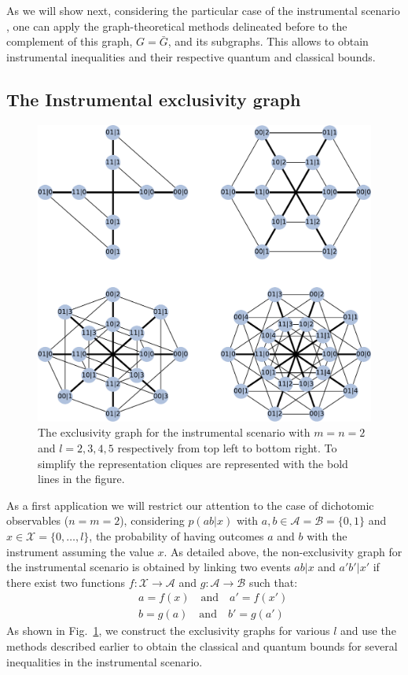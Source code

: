\documentclass[letterpaper]{article}
\begin{document}
As we will show next, considering the particular case of the instrumental
scenario \cite{pearl1995, bonet2001}, one can apply the graph-theoretical methods delineated before
to the complement of this graph, $G=\bar{G}$, and its subgraphs. This allows to
obtain instrumental inequalities and their respective quantum and
classical bounds.

\subsection{The Instrumental exclusivity graph}
\begin{figure}[t]
    \centering
    \includegraphics[width=\columnwidth]{images/instrumental_exgraph.pdf}
    \caption{
    The exclusivity graph for the instrumental scenario with $m = n =2$ and $l=2,3,4,5$
    respectively from top left to bottom right. 
    To simplify the representation cliques are represented with the bold lines
    in the figure.}
    \label{fig:instrumental_exgraphs}
\end{figure}

As a first application we will restrict our attention to the case of
dichotomic observables ($n = m = 2$), considering $p(ab|x)$ with $a, b \in
\mathcal{A} = \mathcal{B} = \{0,1\}$ and $x \in
\mathcal{X} = \{0,\ldots,l\}$, the probability of having outcomes $a$ and $b$
with the instrument assuming the value $x$. As detailed above, the
non-exclusivity graph for the instrumental scenario is obtained by linking two
events $ab|x$ and $a'b'|x'$ if there exist two functions $f:\mathcal{X}
\rightarrow \mathcal{A}$ and $g:\mathcal{A} \rightarrow
\mathcal{B}$ such that:
\begin{eqnarray}
   & &  a = f(x) \quad\text{and}\quad a'=f(x')\\ \nonumber
   & & b = g(a) \quad\text{and}\quad b'=g(a')
    \label{eq:non_exclusivity_condition}
\end{eqnarray}
As shown in Fig.~\ref{fig:instrumental_exgraphs}, we construct the exclusivity
graphs for various $l$ and use the methods described earlier to
obtain the classical and quantum bounds for several inequalities in the
instrumental scenario. 
\end{document}
